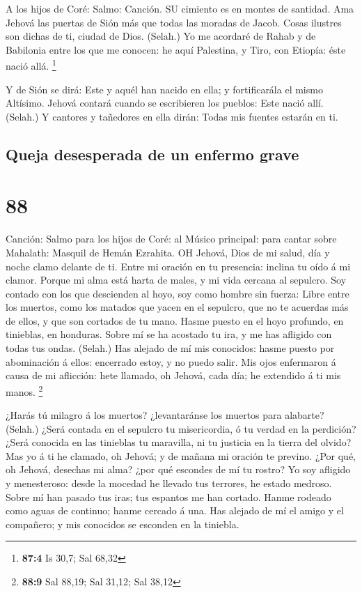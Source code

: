  A los hijos de Coré: Salmo: Canción. SU cimiento es en
montes de santidad.  Ama Jehová las puertas de Sión más que
todas las moradas de Jacob.  Cosas ilustres son dichas de
ti, ciudad de Dios. (Selah.)  Yo me acordaré de Rahab y de
Babilonia entre los que me conocen: he aquí Palestina, y Tiro, con
Etiopía: éste nació allá. \footnote{\textbf{87:4} Is 30,7; Sal 68,32}

 Y de Sión se dirá: Este y aquél han nacido en ella; y
fortificarála el mismo Altísimo.  Jehová contará cuando se
escribieren los pueblos: Este nació allí. (Selah.)  Y
cantores y tañedores en ella dirán: Todas mis fuentes estarán en ti.

\hypertarget{queja-desesperada-de-un-enfermo-grave}{%
\subsection{Queja desesperada de un enfermo
grave}\label{queja-desesperada-de-un-enfermo-grave}}

\hypertarget{section-87}{%
\section{88}\label{section-87}}

 Canción: Salmo para los hijos de Coré: al Músico principal:
para cantar sobre Mahalath: Masquil de Hemán Ezrahita. OH Jehová, Dios
de mi salud, día y noche clamo delante de ti.  Entre mi
oración en tu presencia: inclina tu oído á mi clamor. 
Porque mi alma está harta de males, y mi vida cercana al sepulcro.
 Soy contado con los que descienden al hoyo, soy como hombre
sin fuerza:  Libre entre los muertos, como los matados que
yacen en el sepulcro, que no te acuerdas más de ellos, y que son
cortados de tu mano.  Hasme puesto en el hoyo profundo, en
tinieblas, en honduras.  Sobre mí se ha acostado tu ira, y
me has afligido con todas tus ondas. (Selah.)  Has alejado
de mí mis conocidos: hasme puesto por abominación á ellos: encerrado
estoy, y no puedo salir.  Mis ojos enfermaron á causa de mi
aflicción: hete llamado, oh Jehová, cada día; he extendido á ti mis
manos. \footnote{\textbf{88:9} Sal 88,19; Sal 31,12; Sal 38,12}

 ¿Harás tú milagro á los muertos? ¿levantaránse los muertos
para alabarte? (Selah.)  ¿Será contada en el sepulcro tu
misericordia, ó tu verdad en la perdición?  ¿Será conocida
en las tinieblas tu maravilla, ni tu justicia en la tierra del olvido?
 Mas yo á ti he clamado, oh Jehová; y de mañana mi oración
te previno.  ¿Por qué, oh Jehová, desechas mi alma? ¿por
qué escondes de mí tu rostro?  Yo soy afligido y
menesteroso: desde la mocedad he llevado tus terrores, he estado
medroso.  Sobre mí han pasado tus iras; tus espantos me han
cortado.  Hanme rodeado como aguas de continuo; hanme
cercado á una.  Has alejado de mí el amigo y el compañero;
y mis conocidos se esconden en la tiniebla.

